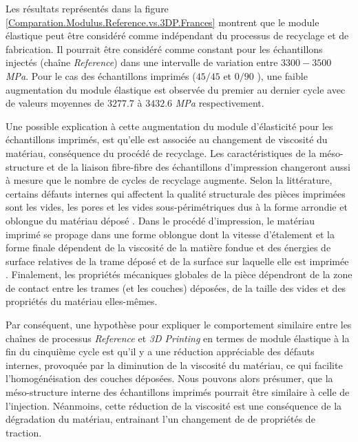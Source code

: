 Les résultats représentés dans la figure \ref{Comparation.Modulus.Reference.vs.3DP.Frances} montrent que le module élastique peut être considéré comme indépendant du processus de recyclage et de fabrication.
Il pourrait être considéré comme constant pour les échantillons injectés (chaîne \textit{Reference}) dans une intervalle de variation entre $3300-3500$ \textit{MPa}.
Pour le cas des échantillons imprimés ($45/45$ et $0/90$ ), une faible augmentation du module élastique est observée du premier au dernier cycle avec de valeurs moyennes de $3277.7$ à $3432.6$ \textit{MPa} respectivement.

Une possible explication à cette augmentation du module d'élasticité pour les échantillons imprimés, est  qu'elle est associée au changement de viscosité du matériau, conséquence du procédé de recyclage.
Les caractéristiques de la méso-structure et de la liaison fibre-fibre des échantillons d'impression changeront aussi à mesure que le nombre de cycles de recyclage augmente.
Selon la littérature, certains défauts internes qui affectent la qualité structurale des pièces imprimées sont  les vides, les pores et les vides sous-périmétriques dus à la forme arrondie et oblongue du matériau déposé \parencite{Agarwala1996, N.Turner2014}.
Dans le procédé d'impression, le matériau imprimé se propage dans une forme oblongue dont la vitesse d'étalement et la forme finale dépendent de la viscosité de la matière fondue et des énergies de surface relatives de la trame déposé  et de la surface sur laquelle elle est imprimée \parencite{N.Turner2014}. 
Finalement, les propriétés mécaniques globales de la pièce dépendront de la zone de contact entre les trames (et les couches) déposées, de la taille des vides et des propriétés du matériau elles-mêmes.

Par conséquent, une hypothèse pour expliquer le comportement similaire entre les chaînes de processus \textit{Reference} et \textit{3D Printing} en termes de module élastique à la fin du cinquième cycle est qu'il y a une réduction appréciable des défauts internes,  provoquée par la diminution de la viscosité du matériau, ce qui facilite l'homogénéisation des couches déposées.
%
Nous pouvons alors présumer, que la méso-structure interne des échantillons imprimés pourrait être similaire à celle de l'injection.
Néanmoins, cette réduction de la viscosité est une conséquence de la dégradation du matériau, entrainant l'un changement de de propriétés de traction.





